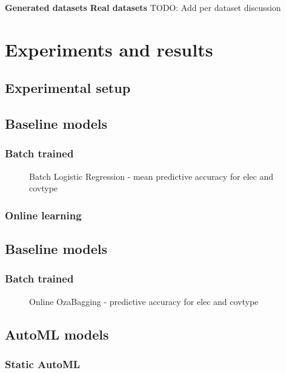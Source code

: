 \documentclass{sig-alternate-br}
\begin{document}
\textbf{Generated datasets}
\textbf{Real datasets}
TODO: Add per dataset discussion

\section{Experiments and results}

\subsection{Experimental setup}

\subsection{Baseline models}
\subsubsection{Batch trained}
\begin{figure}[h]
\centering 
{}
\caption{Batch Logistic Regression - mean predictive accuracy for elec and covtype}
\label{fig:bathclr}
\end{figure}

\subsubsection{Online learning}

\subsection{Baseline models}
\subsubsection{Batch trained}
\begin{figure}[h]
\centering 
{}
\caption{Online OzaBagging - predictive accuracy for elec and covtype}
\label{fig:bathclr}
\end{figure}

\subsection{AutoML models}
\subsubsection{Static AutoML}
\end{document}
